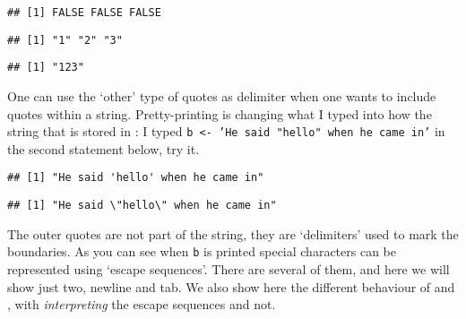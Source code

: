 \documentclass[paper=a4,10pt,div=17,headsepline,BCOR=12mm,twoside,open=right]{scrbook}\usepackage{knitr}
\begin{document}
\begin{knitrout}\footnotesize
{}\color{fgcolor}\begin{kframe}
\begin{alltt}
 \hlkwb{<-} \hlstd{(}\hlstd{,} \hlstd{,} \hlstd{)}
 \hlkwb{<-} 
 \hlopt{==} 
\end{alltt}
\begin{verbatim}
## [1] FALSE FALSE FALSE
\end{verbatim}
\begin{alltt}
\end{alltt}
\begin{verbatim}
## [1] "1" "2" "3"
\end{verbatim}
\begin{alltt}
\end{alltt}
\begin{verbatim}
## [1] "123"
\end{verbatim}
\end{kframe}
\end{knitrout}

One can use the `other' type of quotes as delimiter when one wants to include quotes within a string. Pretty-printing is changing what I typed into how the string that is stored in \R: I typed \texttt{b <- 'He said "hello" when he came in'} in the second statement below, try it.

\begin{knitrout}\footnotesize
{}\color{fgcolor}\begin{kframe}
\begin{alltt}
 \hlkwb{<-} 
\end{alltt}
\begin{verbatim}
## [1] "He said 'hello' when he came in"
\end{verbatim}
\begin{alltt}
 \hlkwb{<-} 
\end{alltt}
\begin{verbatim}
## [1] "He said \"hello\" when he came in"
\end{verbatim}
\end{kframe}
\end{knitrout}

The outer quotes are not part of the string, they are `delimiters' used to mark the boundaries. As you can see when \texttt{b} is printed special characters can be represented using `escape sequences'. There are several of them, and here we will show just two, newline and tab. We also show here the different behaviour of  and , with  \emph{interpreting} the escape sequences and  not.
\end{document}
